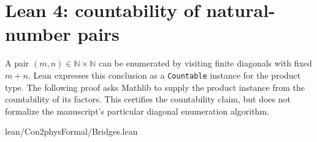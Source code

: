\section{Lean 4: countability of natural-number pairs}
\label{sec:lean-bridge-08}
A pair $(m,n)\in\mathbb{N}\times\mathbb{N}$ can be enumerated
by visiting finite diagonals with fixed $m+n$.
Lean expresses this conclusion as a \texttt{Countable} instance
for the product type. The following proof asks Mathlib to supply
the product instance from the countability of its factors.
This certifies the countability claim, but does not formalize
the manuscript's particular diagonal enumeration algorithm.


{lean/Con2physFormal/Bridges.lean}
